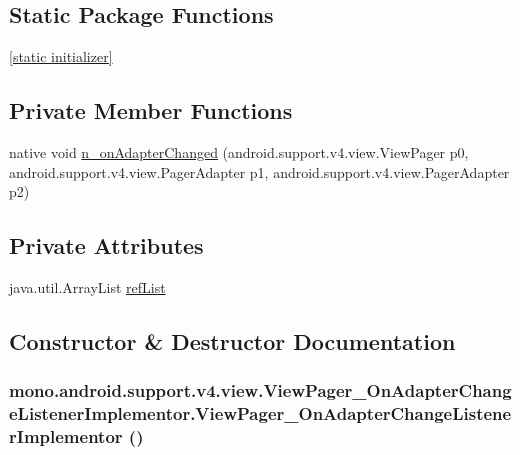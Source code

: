 \subsection*{Static Package Functions}
\begin{CompactItemize}
\item 
\hyperlink{classmono_1_1android_1_1support_1_1v4_1_1view_1_1_view_pager___on_adapter_change_listener_implementor_a10fe86c300da5570a037d716f50768a}{\mbox{[}static initializer\mbox{]}}
\end{CompactItemize}
\subsection*{Private Member Functions}
\begin{CompactItemize}
\item 
native void \hyperlink{classmono_1_1android_1_1support_1_1v4_1_1view_1_1_view_pager___on_adapter_change_listener_implementor_02dcfc9434d277d9b65a7bffe37ccc8e}{n\_\-onAdapterChanged} (android.support.v4.view.ViewPager p0, android.support.v4.view.PagerAdapter p1, android.support.v4.view.PagerAdapter p2)
\end{CompactItemize}
\subsection*{Private Attributes}
\begin{CompactItemize}
\item 
java.util.ArrayList \hyperlink{classmono_1_1android_1_1support_1_1v4_1_1view_1_1_view_pager___on_adapter_change_listener_implementor_99e4dba7dd3e83fbfdeecd8c81ebfd83}{refList}
\end{CompactItemize}


\subsection{Constructor \& Destructor Documentation}
\hypertarget{classmono_1_1android_1_1support_1_1v4_1_1view_1_1_view_pager___on_adapter_change_listener_implementor_f64771108acd41e113ce5d23a765687d}{
\subsubsection[{ViewPager\_\-OnAdapterChangeListenerImplementor}]{\setlength{\rightskip}{0pt plus 5cm}mono.android.support.v4.view.ViewPager\_\-OnAdapterChangeListenerImplementor.ViewPager\_\-OnAdapterChangeListenerImplementor ()}}
\label{classmono_1_1android_1_1support_1_1v4_1_1view_1_1_view_pager___on_adapter_change_listener_implementor_f64771108acd41e113ce5d23a765687d}




